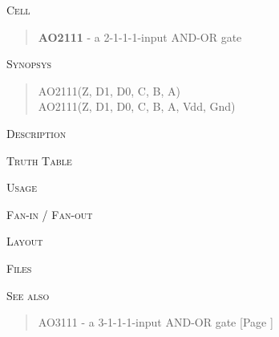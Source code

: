 
\label{AO2111}
\textsc{Cell}
\begin{quote}
    \textbf{AO2111} - a 2-1-1-1-input AND-OR gate
\end{quote}

\textsc{Synopsys}
\begin{quote}
    AO2111(Z, D1, D0, C, B, A) \\
    AO2111(Z, D1, D0, C, B, A, Vdd, Gnd)
\end{quote}

\textsc{Description}

%

\textsc{Truth Table}


\textsc{Usage}

\textsc{Fan-in / Fan-out}

\textsc{Layout}

\textsc{Files}

\textsc{See also}
\begin{quote}
    AO3111 - a 3-1-1-1-input AND-OR gate [Page \pageref{AO3111}]
\end{quote}
